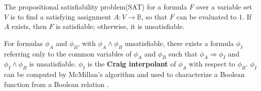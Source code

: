 \documentclass[twocolumn]{article}
\makeatletter
\def\subsection{\@startsection {subsection}{2}{\z@}{16pt plus 2pt minus 2pt}
{6pt plus 2pt minus 2pt}{\normalsize\sl
\edef\@svsec{\thesubsection.\ }}}
\def\thesubsection{\Alph{subsection}}
\makeatother
\begin{document}
The propositional satisfiability problem(SAT) for a formula $F$ over a variable set $V$ 
is to find a satisfying assignment $A:V\to \mathbb{B}$,
so that $F$ can be evaluated to $1$.
If $A$ exists, then $F$ is satisfiable;
otherwise,
it is unsatisfiable.

 




For formulas $\phi_A$ and $\phi_B$,
with $\phi_A\wedge \phi_B$ unsatisfiable,
there exists a formula $\phi_I$ referring only
to the common variables of $\phi_A$ and $\phi_B$ such that $\phi_A\Rightarrow \phi_I$
and $\phi_I\wedge \phi_B$ is unsatisfiable.
$\phi_I$ is the \textbf{Craig interpolant} \cite{Craig} of $\phi_A$ with respect to $\phi_B$.
$\phi_I$ can be computed by McMillan's algorithm \cite{interp_McMillan}
and used to characterize a Boolean function from a Boolean relation \cite{InterpBoolFunction}.
\end{document}
